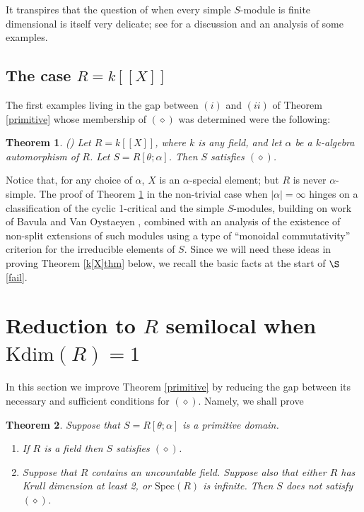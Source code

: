\documentclass[a4paper, 11pt]{article}
\newtheorem{theorem}{Theorem}[section]
\theoremstyle{definition}
\begin{document}
It transpires that the question of when every simple $S$-module is finite dimensional is itself very delicate; see \cite[$\S$6, $\S$7]{BCM} for a discussion and an analysis of some examples.

\medskip

\subsection{The case $R = k[[X]]$}\label{powerseries}

The first examples living in the gap between $(i)$ and $(ii)$ of Theorem \ref{primitive} whose membership of $(\diamond)$ was determined were the following:

\begin{theorem}\label{power}(\cite[Theorem 1.4]{BCM2}) Let $R = k[[X]]$, where $k$ is any field, and let $\alpha$ be a $k$-algebra automorphism of $R$. Let $S = R[\theta; \alpha]$. Then $S$ satisfies $(\diamond)$.
\end{theorem}

Notice that, for any choice of $\alpha$, $X$ is an $\alpha$-special element; but $R$ is never $\alpha$-simple. The proof of Theorem \ref{power} in the non-trivial case when $|\alpha| = \infty$ hinges on a classification of the cyclic 1-critical and the simple $S$-modules, building on work of Bavula and Van Oystaeyen \cite{BVO}, combined with an analysis of the existence of non-split extensions of such modules using a type of ``monoidal commutativity'' criterion for the irreducible elements of $S$. Since we will need these ideas in proving Theorem \ref{k[X]thm} below, we recall the basic facts at the start of $\S$\ref{fail}. 

\bigskip

\section{Reduction to $R$ semilocal when $\mathrm{Kdim}(R) = 1$}\label{reduction}

In this section we improve Theorem \ref{primitive} by reducing the gap between its necessary and sufficient conditions for $(\diamond)$. Namely, we shall prove

\begin{theorem}\label{better}Suppose that $S = R[\theta; \alpha]$ is a primitive domain.
\begin{enumerate}
\item[(i)] If $R$ is a field then $S$ satisfies $(\diamond)$.
\item[(ii)] Suppose that $R$ contains an uncountable field. Suppose also that either $R$ has Krull
dimension at least 2, or $\mathrm{Spec}(R)$ is infinite. Then $S$ does not satisfy $(\diamond)$.
\end{enumerate}
\end{theorem}
\end{document}
